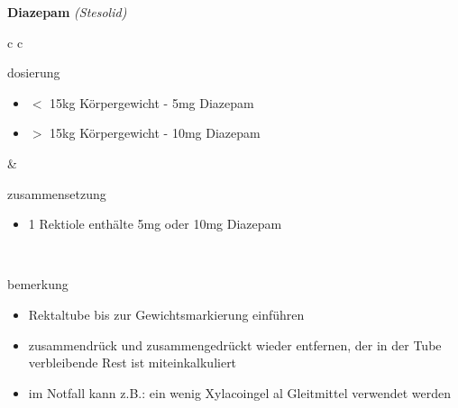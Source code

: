 \begin{frame}{
    \textbf{Diazepam}
    \textit{(Stesolid)}
}
    \begin{tabular}{c c}
        \begin{beamercolorbox}[wd=\boxwidth\textwidth,ht=\boxheight\textheight,sep=1em]{dosierung}
            \begin{itemize}
                \item $<$ 15kg Körpergewicht - 5mg Diazepam
                \item $>$ 15kg Körpergewicht - 10mg Diazepam
            \end{itemize}
        \end{beamercolorbox} & 
        \begin{beamercolorbox}[wd=\boxwidth\textwidth,ht=\boxheight\textheight,sep=1em]{zusammensetzung}
            \begin{itemize}
                \item 1 Rektiole enthälte 5mg oder 10mg Diazepam
            \end{itemize}
        \end{beamercolorbox} \\
        \begin{beamercolorbox}[wd=\textwidth,ht=\boxheight\textheight,sep=1em]{bemerkung}
            \begin{itemize}
                \item Rektaltube bis zur Gewichtsmarkierung einführen
                \item zusammendrück und zusammengedrückt wieder entfernen, der in der Tube verbleibende Rest ist miteinkalkuliert
                \item im Notfall kann z.B.: ein wenig Xylacoingel al Gleitmittel verwendet werden
            \end{itemize}
        \end{beamercolorbox} \\
    \end{tabular}
\end{frame}

